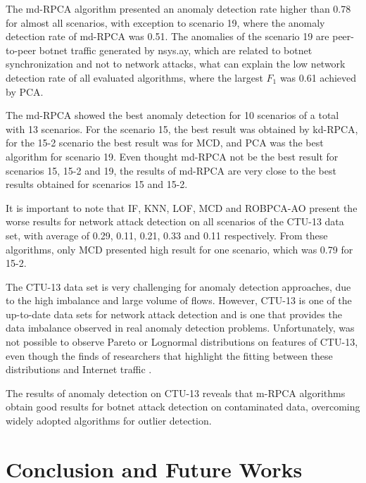 \documentclass[review]{elsarticle}
\begin{document}
The md-RPCA algorithm presented an anomaly detection rate higher than 0.78 for almost all scenarios, with exception to scenario 19, where the anomaly detection rate of md-RPCA was 0.51. The anomalies of the scenario 19 are peer-to-peer botnet traffic generated by nsys.ay, which are related to botnet synchronization and not to network attacks, what can explain the low network detection rate of all evaluated algorithms, where the largest $F_1$ was 0.61 achieved by PCA.

The md-RPCA showed the best anomaly detection for 10 scenarios of a total with 13 scenarios. For the scenario 15, the best result was obtained by kd-RPCA, for the 15-2 scenario the best result was for MCD, and PCA was the best algorithm for scenario 19. Even thought md-RPCA not be the best result for scenarios 15, 15-2 and 19, the results of md-RPCA are very close to the best results obtained for scenarios 15 and 15-2.

It is important to note that IF, KNN, LOF, MCD and ROBPCA-AO present the worse results for network attack detection on all scenarios of the CTU-13 data set, with average of 0.29, 0.11, 0.21, 0.33 and 0.11 respectively. From these algorithms, only MCD presented high result for one scenario, which was 0.79 for 15-2.

The CTU-13 data set is very challenging for anomaly detection approaches, due to the high imbalance and large volume of flows. However, CTU-13 is one of the up-to-date data sets for network attack detection and is one that provides the data imbalance observed in real anomaly detection problems. Unfortunately, was not possible to observe Pareto or Lognormal distributions on features of CTU-13, even though the finds of researchers that highlight the fitting between these distributions and Internet traffic \cite{benson2010network, leon2017probability}. 

The results of anomaly detection on CTU-13 reveals that m-RPCA algorithms obtain good results for botnet attack detection on contaminated data, overcoming widely adopted algorithms for outlier detection.

\section{Conclusion and Future Works}
\label{sec:conclusionandfutureworks}
\end{document}
